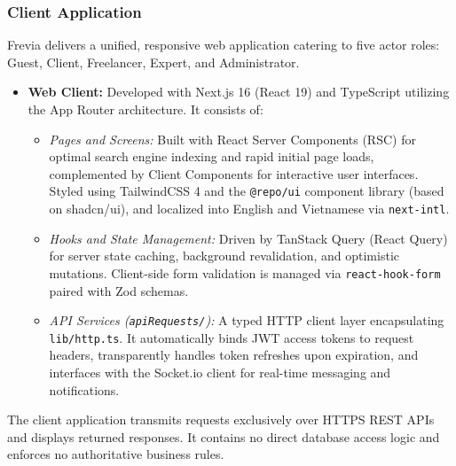\subsubsection*{Client Application}
Frevia delivers a unified, responsive web application catering to five actor roles: Guest, Client, Freelancer, Expert, and Administrator.
\begin{itemize}[leftmargin=*]
    \item \textbf{Web Client:} Developed with Next.js 16 (React 19) and TypeScript utilizing the App Router architecture. It consists of:
    \begin{itemize}[leftmargin=*]
        \item \textit{Pages and Screens:} Built with React Server Components (RSC) for optimal search engine indexing and rapid initial page loads, complemented by Client Components for interactive user interfaces. Styled using TailwindCSS 4 and the \texttt{@repo/ui} component library (based on shadcn/ui), and localized into English and Vietnamese via \texttt{next-intl}.
        \item \textit{Hooks and State Management:} Driven by TanStack Query (React Query) for server state caching, background revalidation, and optimistic mutations. Client-side form validation is managed via \texttt{react-hook-form} paired with Zod schemas.
        \item \textit{API Services (\texttt{apiRequests/}):} A typed HTTP client layer encapsulating \texttt{lib/http.ts}. It automatically binds JWT access tokens to request headers, transparently handles token refreshes upon expiration, and interfaces with the Socket.io client for real-time messaging and notifications.
    \end{itemize}
\end{itemize}
The client application transmits requests exclusively over HTTPS REST APIs and displays returned responses. It contains no direct database access logic and enforces no authoritative business rules.

